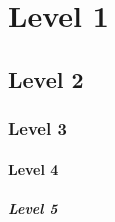 \section{Level 1}
\subsection{Level 2}
\subsubsection{Level 3}
\paragraph{Level 4}
\subparagraph{Level 5}
